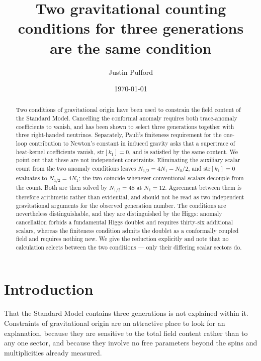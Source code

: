 \documentclass[aps,prd,twocolumn,superscriptaddress,nofootinbib,10pt]{revtex4-2}
\begin{document}
\title{Two gravitational counting conditions for three generations\\
are the same condition}

\author{Justin Pulford}

\date{\today}

\begin{abstract}
Two conditions of gravitational origin have been used to constrain the field content of the
Standard Model. Cancelling the conformal anomaly requires both trace-anomaly coefficients to
vanish, and has been shown to select three generations together with three right-handed neutrinos.
Separately, Pauli's finiteness requirement for the one-loop contribution to Newton's constant in
induced gravity asks that a supertrace of heat-kernel coefficients vanish, $\mathrm{str}[k_1] = 0$,
and is satisfied by the same content. We point out that these are not independent constraints.
Eliminating the auxiliary scalar count from the two anomaly conditions leaves
$N_{1/2} = 4N_1 - N_0/2$, and $\mathrm{str}[k_1] = 0$ evaluates to $N_{1/2} = 4N_1$; the two
coincide whenever conventional scalars decouple from the count. Both are then solved by
$N_{1/2} = 48$ at $N_1 = 12$. Agreement between them is therefore arithmetic rather than
evidential, and should not be read as two independent gravitational arguments for the observed
generation number. The conditions are nevertheless distinguishable, and they are distinguished by
the Higgs: anomaly cancellation forbids a fundamental Higgs doublet and requires thirty-six
additional scalars, whereas the finiteness condition admits the doublet as a conformally coupled
field and requires nothing new. We give the reduction explicitly and note that no calculation
selects between the two conditions --- only their differing scalar sectors do.
\end{abstract}

\maketitle

\section{Introduction}\label{sec:intro}

That the Standard Model contains three generations is not explained within it. Constraints of
gravitational origin are an attractive place to look for an explanation, because they are sensitive
to the total field content rather than to any one sector, and because they involve no free
parameters beyond the spins and multiplicities already measured.
\end{document}
